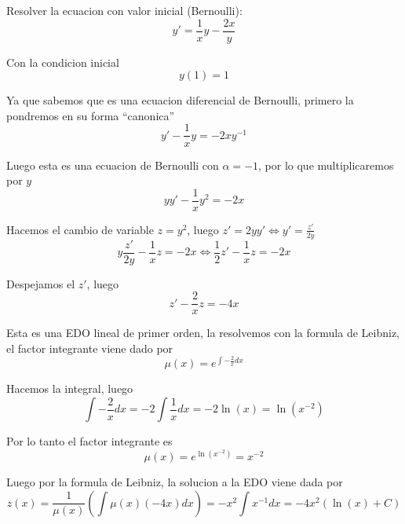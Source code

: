 \documentclass[a4paper,oneside,10.5pt]{article}
\begin{document}
\begin{prob}[control]
  Resolver la ecuacion con valor inicial (Bernoulli):
  \begin{equation*}
    y' = \frac{1}{x}y - \frac{2x}{y}
  \end{equation*}

  Con la condicion inicial
  \begin{equation*}
    y(1) = 1
  \end{equation*}

\end{prob}
\begin{sol}
  Ya que sabemos que es una ecuacion diferencial de Bernoulli, primero la pondremos en su forma ``canonica''
  \begin{equation*}
    y' - \frac{1}{x}y = -2x y^{-1}
  \end{equation*}

  Luego esta es una ecuacion de Bernoulli con $\alpha = -1$, por lo que multiplicaremos por $y$
  \begin{equation*}
    yy' - \frac{1}{x}y^{2} = -2x
  \end{equation*}

  Hacemos el cambio de variable $z = y^{2}$, luego $z' = 2yy' \iff y' = \frac{z'}{2y}$
  \begin{equation*}
    y \frac{z'}{2y} - \frac{1}{x} z = -2x \iff \frac{1}{2}z' - \frac{1}{x}z = -2x
  \end{equation*}

  Despejamos el $z'$, luego
  \begin{equation*}
    z' - \frac{2}{x}z = -4x
  \end{equation*}

  Esta es una EDO lineal de primer orden, la resolvemos con la formula de Leibniz, el factor integrante viene dado por
  \begin{equation*}
    \mu(x) = e^{\int -\frac{2}{x} dx}
  \end{equation*}

  Hacemos la integral, luego
  \begin{equation*}
    \int -\frac{2}{x} dx = -2 \int \frac{1}{x} dx = -2 \ln (x) = \ln(x^{-2})
  \end{equation*}

  Por lo tanto el factor integrante es
  \begin{equation*}
    \mu(x) = e^{\ln(x^{-2})} = x^{-2}
  \end{equation*}

  Luego por la formula de Leibniz, la solucion a la EDO viene dada por
  \begin{equation*}
    z(x) = \frac{1}{\mu(x)}(\int \mu(x)(-4x) dx) = -x^{2}\int x^{-1} dx = -4x^{2} (\ln(x) + C)
  \end{equation*}


\end{sol}
\end{document}
